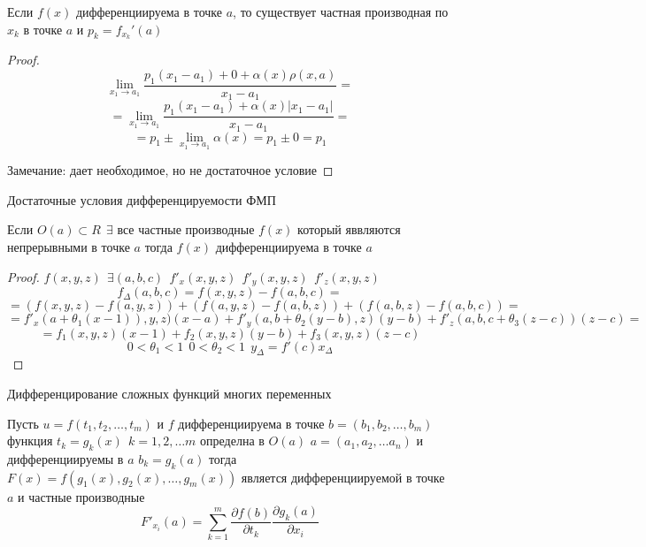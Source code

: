 \begin{theorem}
  Если $f(x)$ дифференциируема в точке $a$, то существует частная производная
  по $x_k$ в точке $a$ и $p_k = f_{x_k}'(a)$
\end{theorem}

\begin{proof}
  $$
  \lim_{x_1 \to a_1}
  \frac{p_1(x_1 - a_1) + 0 + \alpha(x) \rho(x, a)}{x_1 - a_1} =
  $$
  $$
  = \lim_{x_1 \to a_1}
  \frac{p_1(x_1 - a_1) + \alpha(x) |x_1 - a_1|}{x_1 - a_1} =
  $$
  $$
  = p_1 \pm \lim_{x_1 \to a_1} \alpha(x) = p_1 \pm 0 = p_1
  $$

  Замечание: дает необходимое, но не достаточное условие
\end{proof}

\begin{title}[\Large]
  Достаточные условия дифференцируемости ФМП
\end{title}

\begin{theorem}
  Если $O(a) \subset R ~~ \exists$ все частные производные $f(x)$ который
  яввляются непрерывными в точке $a$ тогда $f(x)$ дифференциируема в точке $a$
\end{theorem}

\begin{proof}
  $f(x,y,z) ~~ \exists (a,b,c) ~~ f'_x (x,y,z) ~~ f'_y (x,y,z) ~~ f'_z (x,y,z)$
  $$
  f_{\Delta}(a,b,c) = f(x,y,z) - f(a,b,c) =
  $$
  $$
  = (f(x,y,z) - f(a,y,z)) +
  (f(a,y,z) - f(a,b,z)) + (f(a,b,z) - f(a,b,c)) =
  $$
  $$
  = f'_x(a + \theta_1(x-1)), y, z)(x-a) + f'_y(a,b + \theta_2(y-b), z)(y-b) +
  f'_z(a,b,c + \theta_3(z-c))(z-c) =
  $$
  $$
  = f_1(x,y,z)(x-1) + f_2(x,y,z)(y-b) + f_3(x,y,z)(z-c)
  $$
  $$
  0 < \theta_1 < 1 ~~ 0 < \theta_2 < 1 ~~ y_{\Delta} = f'(c)x_{\Delta}
  $$
\end{proof}

\begin{title}[\Large]
  Дифференцирование сложных функций многих переменных
\end{title}

\begin{theorem}
  Пусть $u = f(t_1, t_2, \ldots, t_m)$ и $f$ дифференциируема в точке
  $b = (b_1, b_2, \ldots, b_m)$ функция $t_k = g_k(x) ~~ k = 1,2, \ldots m$
  определна в $O(a)$ $a = (a_1, a_2, \ldots a_n)$ и дифференциируемы в $a$
  $b_k = g_k(a)$ тогда $F(x) = f(g_1(x), g_2(x), \ldots, g_m(x))$ является
  дифференциируемой в точке $a$ и частные производные
  $$
  F'_{x_i}(a) = \sum_{k=1}^m \frac{\partial f(b)}{\partial t_k}
  \frac{\partial g_k(a)}{\partial x_i}
  $$
\end{theorem}

